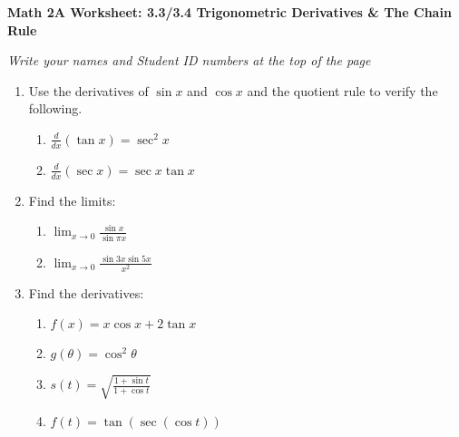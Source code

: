\documentclass[12pt,fleqn]{article}
\begin{document}
\begin{center}
	\textbf{Math 2A Worksheet: 3.3/3.4 Trigonometric Derivatives \& The Chain Rule}
\end{center}

\emph{Write your names and Student ID numbers at the top of the page}


\begin{enumerate}
\item Use the derivatives of $\sin x$ and $\cos x$ and the quotient rule to verify the following.
\begin{enumerate}
\item $\frac{d}{dx}(\tan x)=\sec^2x$\vfill


\item $\frac{d}{dx}(\sec x)=\sec x\tan x$\vfill

\end{enumerate}

\item Find the limits:
\begin{enumerate}
\item $\displaystyle\lim_{x\to0}\frac{\sin x}{\sin \pi x}$\vfill

\item $\displaystyle\lim_{x\to0}\frac{\sin 3x\sin 5x}{x^2}$\vfill


\end{enumerate}

\newpage
\item Find the derivatives:
\begin{enumerate}
\item $f(x)=x\cos x+2\tan x$\vfill



\item $g(\theta)=\cos^2\theta$\vfill

\item $s(t)=\displaystyle\sqrt{\frac{1+\sin t}{1+\cos t}}$\vfill

\item $f(t)=\tan(\sec(\cos t))$\vfill
\end{enumerate}




\end{enumerate}
\end{document}
